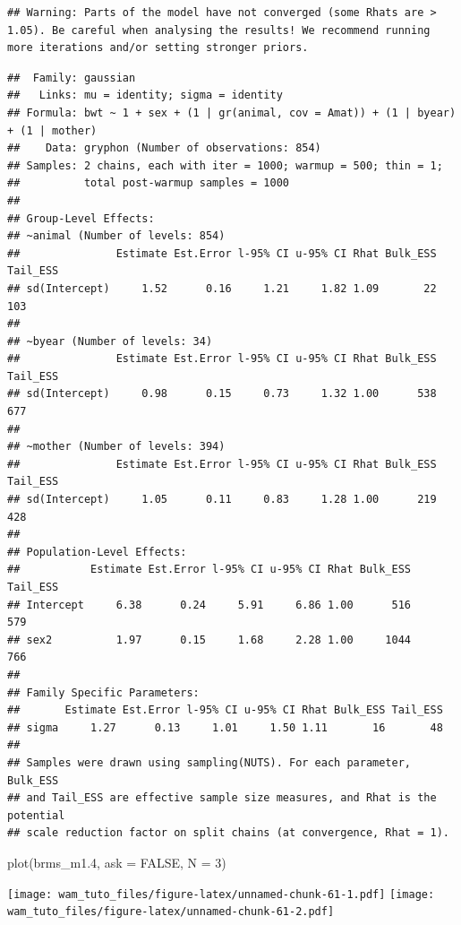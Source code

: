 \documentclass[
  12pt,
]{book}
\newenvironment{Shaded}{\begin{snugshade}}{\end{snugshade}}
\newcommand{\AttributeTok}[1]{\textcolor[rgb]{0.77,0.63,0.00}{#1}}
\newcommand{\ConstantTok}[1]{\textcolor[rgb]{0.00,0.00,0.00}{#1}}
\newcommand{\DecValTok}[1]{\textcolor[rgb]{0.00,0.00,0.81}{#1}}
\newcommand{\FloatTok}[1]{\textcolor[rgb]{0.00,0.00,0.81}{#1}}
\newcommand{\FunctionTok}[1]{\textcolor[rgb]{0.00,0.00,0.00}{#1}}
\newcommand{\NormalTok}[1]{#1}
\begin{document}
\begin{verbatim}
## Warning: Parts of the model have not converged (some Rhats are > 1.05). Be careful when analysing the results! We recommend running more iterations and/or setting stronger priors.
\end{verbatim}

\begin{verbatim}
##  Family: gaussian 
##   Links: mu = identity; sigma = identity 
## Formula: bwt ~ 1 + sex + (1 | gr(animal, cov = Amat)) + (1 | byear) + (1 | mother) 
##    Data: gryphon (Number of observations: 854) 
## Samples: 2 chains, each with iter = 1000; warmup = 500; thin = 1;
##          total post-warmup samples = 1000
## 
## Group-Level Effects: 
## ~animal (Number of levels: 854) 
##               Estimate Est.Error l-95% CI u-95% CI Rhat Bulk_ESS Tail_ESS
## sd(Intercept)     1.52      0.16     1.21     1.82 1.09       22      103
## 
## ~byear (Number of levels: 34) 
##               Estimate Est.Error l-95% CI u-95% CI Rhat Bulk_ESS Tail_ESS
## sd(Intercept)     0.98      0.15     0.73     1.32 1.00      538      677
## 
## ~mother (Number of levels: 394) 
##               Estimate Est.Error l-95% CI u-95% CI Rhat Bulk_ESS Tail_ESS
## sd(Intercept)     1.05      0.11     0.83     1.28 1.00      219      428
## 
## Population-Level Effects: 
##           Estimate Est.Error l-95% CI u-95% CI Rhat Bulk_ESS Tail_ESS
## Intercept     6.38      0.24     5.91     6.86 1.00      516      579
## sex2          1.97      0.15     1.68     2.28 1.00     1044      766
## 
## Family Specific Parameters: 
##       Estimate Est.Error l-95% CI u-95% CI Rhat Bulk_ESS Tail_ESS
## sigma     1.27      0.13     1.01     1.50 1.11       16       48
## 
## Samples were drawn using sampling(NUTS). For each parameter, Bulk_ESS
## and Tail_ESS are effective sample size measures, and Rhat is the potential
## scale reduction factor on split chains (at convergence, Rhat = 1).
\end{verbatim}

\begin{Shaded}
\begin{Highlighting}[]
\FunctionTok{plot}\NormalTok{(brms\_m1}\FloatTok{.4}\NormalTok{, }\AttributeTok{ask =} \ConstantTok{FALSE}\NormalTok{, }\AttributeTok{N =} \DecValTok{3}\NormalTok{)}
\end{Highlighting}
\end{Shaded}

\texttt{[image: wam\_tuto\_files/figure-latex/unnamed-chunk-61-1.pdf]} \texttt{[image: wam\_tuto\_files/figure-latex/unnamed-chunk-61-2.pdf]}
\end{document}
